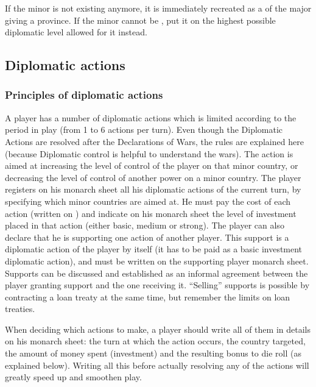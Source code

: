 \aparag If the minor is not existing anymore, it is immediately recreated as a
\VASSAL of the major giving a province.
\bparag If the minor cannot be \VASSAL, put it on the highest possible
diplomatic level allowed for it instead.

\subsection{Diplomatic actions}\label{chDiplo:Diplomatic Actions}


\subsubsection{Principles of diplomatic actions}
\aparag A player has a number of diplomatic actions which is limited according
to the period in play (from 1 to 6 actions per turn). Even though the
Diplomatic Actions are resolved after the Declarations of Wars, the rules are
explained here (because Diplomatic control is helpful to understand the wars).
\bparag The action is aimed at increasing the level of control of the player
on that minor country, or decreasing the level of control of another power on
a minor country.
\bparag The player registers on his monarch sheet all his diplomatic actions
of the current turn, by specifying which minor countries are aimed at. He must
pay the cost of each action (written on ) and
indicate on his monarch sheet the level of investment placed in that action
(either basic, medium or strong).
\label{chDiplo:Diplomatic Support}
The player can also declare that he is supporting one action of another
player. This support is a diplomatic action of the player by itself (it has to
be paid as a basic investment diplomatic action), and must be written on the
supporting player monarch sheet.
\bparag Supports can be discussed and established as an informal agreement
between the player granting support and the one receiving it.
\bparag ``Selling'' supports is possible by contracting a loan treaty at the
same time, but remember the limits on loan treaties.

 When deciding which actions to make, a player should
write all of them in details on his monarch sheet: the turn at which the
action occurs, the country targeted, the amount of money spent (investment)
and the resulting bonus to die roll (as explained below). Writing all this
before actually resolving any of the actions will greatly speed up and
smoothen play.

